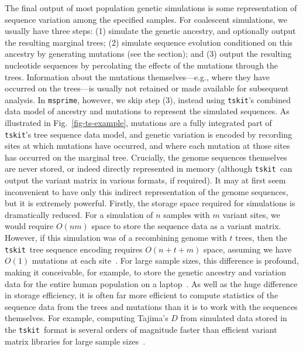 \documentclass[9pt,twocolumn,twoside,lineno]{gsajnl}
\newcommand{\msprime}[0]{\texttt{msprime}}
\newcommand{\tskit}[0]{\texttt{tskit}}
\begin{document}
The final output of most population genetic simulations is some representation
of sequence variation among the specified samples. For coalescent
simulations, we usually have three steps: (1) simulate
the genetic ancestry, and optionally output the resulting marginal trees;
(2) simulate sequence evolution conditioned on this ancestry by generating
mutations (see the  section); and (3) output the
resulting nucleotide sequences by percolating the effects of the mutations through
the trees. Information about the mutations
themselves---e.g., where they have occurred on the
trees---is usually not retained or made available for subsequent analysis.
In \msprime, however, we skip step (3), instead using \tskit's
combined data model of ancestry and mutations
to represent the simulated sequences.
As illustrated in Fig.~\ref{fig-ts-example}, mutations are a
fully integrated part of \tskit's tree sequence data model, and genetic
variation is encoded by recording sites at which mutations
have occurred, and where each mutation at those sites
has occurred on the marginal tree.
Crucially, the genome sequences themselves are never stored, or indeed directly
represented in memory (although \tskit\ can output the variant matrix
in various formats, if required).
It may at first seem inconvenient to have only this indirect representation
of the genome sequences, but it is extremely powerful.
Firstly, the storage space required for simulations is dramatically
reduced. For a simulation of $n$ samples with $m$ variant sites,
we would require $O(nm)$ space to store the sequence data as a variant
matrix. However, if this simulation was of a recombining genome
with $t$ trees, then the \tskit\ tree sequence encoding
requires $O(n + t + m)$ space,
assuming we have $O(1)$ mutations at each site~\citep{kelleher2016efficient}.
For large sample sizes, this difference is profound, making it
conceivable, for example, to store the genetic ancestry
and variation data for the entire human population on a
laptop~\citep{kelleher2019inferring}. As well as the huge
difference in storage efficiency, it is often far more efficient
to compute statistics of the sequence data from the
trees and mutations than it is to work with the sequences themselves.
For example, computing Tajima's $D$ from simulated data stored in the \tskit\ format
is several orders of magnitude faster than efficient variant matrix
libraries for large sample sizes~\citep{ralph2020efficiently}.
\end{document}
